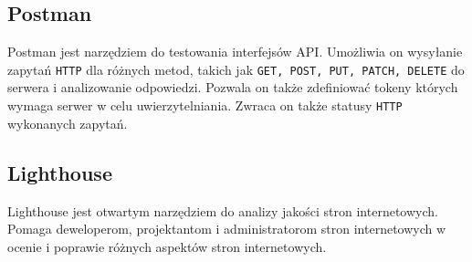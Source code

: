 \subsection{Postman}
Postman jest narzędziem do testowania interfejsów API. Umożliwia on wysyłanie zapytań \texttt{HTTP} dla różnych metod, takich jak \texttt{GET, POST, PUT, PATCH, DELETE} do serwera i analizowanie odpowiedzi. Pozwala on także zdefiniować tokeny których wymaga serwer w celu uwierzytelniania. Zwraca on także statusy \texttt{HTTP} wykonanych zapytań.

\subsection{Lighthouse}
Lighthouse jest otwartym narzędziem do analizy jakości stron internetowych. Pomaga deweloperom, projektantom i administratorom stron internetowych w ocenie i poprawie różnych aspektów stron internetowych.

